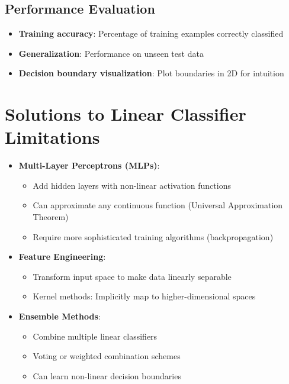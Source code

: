 \subsection{Performance Evaluation}
\begin{itemize}
    \item \textbf{Training accuracy}: Percentage of training examples correctly classified
    \item \textbf{Generalization}: Performance on unseen test data
    \item \textbf{Decision boundary visualization}: Plot boundaries in 2D for intuition
\end{itemize}

\section{Solutions to Linear Classifier Limitations}
\begin{itemize}
    \item \textbf{Multi-Layer Perceptrons (MLPs)}:
    \begin{itemize}
        \item Add hidden layers with non-linear activation functions
        \item Can approximate any continuous function (Universal Approximation Theorem)
        \item Require more sophisticated training algorithms (backpropagation)
    \end{itemize}
    
    \item \textbf{Feature Engineering}:
    \begin{itemize}
        \item Transform input space to make data linearly separable
        \item Kernel methods: Implicitly map to higher-dimensional spaces
    \end{itemize}
    
    \item \textbf{Ensemble Methods}:
    \begin{itemize}
        \item Combine multiple linear classifiers
        \item Voting or weighted combination schemes
        \item Can learn non-linear decision boundaries
    \end{itemize}
\end{itemize}


